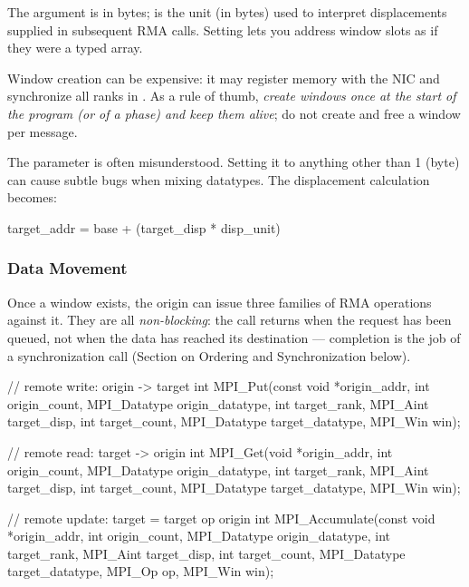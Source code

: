 The  argument is in bytes;  is the unit (in bytes) used to interpret displacements supplied in subsequent RMA calls. Setting  lets you address window slots as if they were a typed array.

\begin{tipsblock}
    Window creation can be expensive: it may register memory with the NIC and synchronize all ranks in . As a rule of thumb, \emph{create windows once at the start of the program (or of a phase) and keep them alive}; do not create and free a window per message.
\end{tipsblock}

\begin{warningblock}
    The  parameter is often misunderstood. Setting it to anything other than 1 (byte) can cause subtle bugs when mixing datatypes. The displacement calculation becomes:
\begin{codeblock}[language=C]
target_addr = base + (target_disp * disp_unit)
\end{codeblock}
\end{warningblock}

\subsubsection{Data Movement}

Once a window exists, the origin can issue three families of RMA operations against it. They are all \emph{non-blocking}: the call returns when the request has been queued, not when the data has reached its destination --- completion is the job of a synchronization call (Section on Ordering and Synchronization below).

\begin{codeblock}[language=C]
// remote write: origin -> target
int MPI_Put(const void *origin_addr, int origin_count, MPI_Datatype origin_datatype,
            int target_rank, MPI_Aint target_disp,
            int target_count, MPI_Datatype target_datatype, MPI_Win win);

// remote read: target -> origin
int MPI_Get(void *origin_addr, int origin_count, MPI_Datatype origin_datatype,
            int target_rank, MPI_Aint target_disp,
            int target_count, MPI_Datatype target_datatype, MPI_Win win);

// remote update: target = target  op  origin
int MPI_Accumulate(const void *origin_addr, int origin_count, MPI_Datatype origin_datatype,
                   int target_rank, MPI_Aint target_disp,
                   int target_count, MPI_Datatype target_datatype,
                   MPI_Op op, MPI_Win win);
\end{codeblock}

